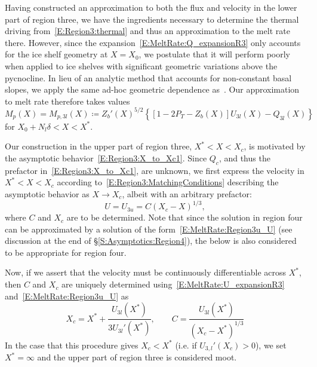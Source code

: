 \documentclass[openacc]{rsproca_new}%
\newcommand{\lt}{\delta} %
\newcommand{\Pt}{\textit{P}_T}
\begin{document}
Having constructed an approximation to both the flux and velocity in the lower part of region three, we have the ingredients necessary to determine the thermal driving from~\eqref{E:Region3:thermal} and thus an approximation to the melt rate there. However, since the expansion~\eqref{E:MeltRate:Q_expansionR3} only accounts for the ice shelf geometry at $X = X_0$, we postulate that it will perform poorly when applied to ice shelves with significant geometric variations above the pycnocline. In lieu of an analytic method that accounts for non-constant basal slopes, we apply the same ad-hoc geometric dependence as~\citet{Lazeroms2018TheCryo}. Our approximation to melt rate therefore takes values
\begin{equation}\label{E:MeltRate:regions3_l}
M_{p}(X) = M_{p,3l}(X)\coloneqq Z_b'(X)^{5/2}\left\{\left[1  - 2\Pt -  Z_b(X)\right] U_{3l}(X) - Q_{3l}(X)\right\}
\end{equation}
for $X_0 + N_l \lt < X < X^*$.

Our construction in the upper part of region three, $X^* < X < X_c$, is motivated by the asymptotic behavior~\eqref{E:Region3:X_to_Xc1}. Since $Q_c$, and thus the prefactor in~\eqref{E:Region3:X_to_Xc1}, are unknown, we first express the velocity in $X^* < X < X_c$ according to~\eqref{E:Region3:MatchingConditions} describing the asymptotic behavior as $X\to X_c$, albeit with an arbitrary prefactor:
\begin{equation}\label{E:MeltRate:Region3u_U}
U =U_{3u} =  C (X_c - X)^{1/3},
\end{equation} 
where $C$ and $X_c$ are to be determined. Note that since the solution in region four can be approximated by a solution of the form~\eqref{E:MeltRate:Region3u_U} (see discussion at the end of \S\ref{S:Asymptotics:Region4}), the below is also considered to be appropriate for region four.

Now, if we assert that the velocity must be continuously differentiable across $X^*$, then $C$ and $X_c$ are uniquely determined using~\eqref{E:MeltRate:U_expansionR3} and~\eqref{E:MeltRate:Region3u_U} as
\begin{equation}\label{E:MeltRate:Xc_expression}
X_c = X^* + \frac{U_{3l}(X^*)}{3 U_{3l}'(X^*)}, \qquad C = \frac{U_{3l}(X^*)}{\left(X_c - X^*\right)^{1/3}}
\end{equation}
In the case that this procedure gives $X_c < X^*$ (i.e. if $U_{3,l}'(X_c) > 0$), we set $X^* = \infty$ and the upper part of region three is considered moot.
\end{document}

